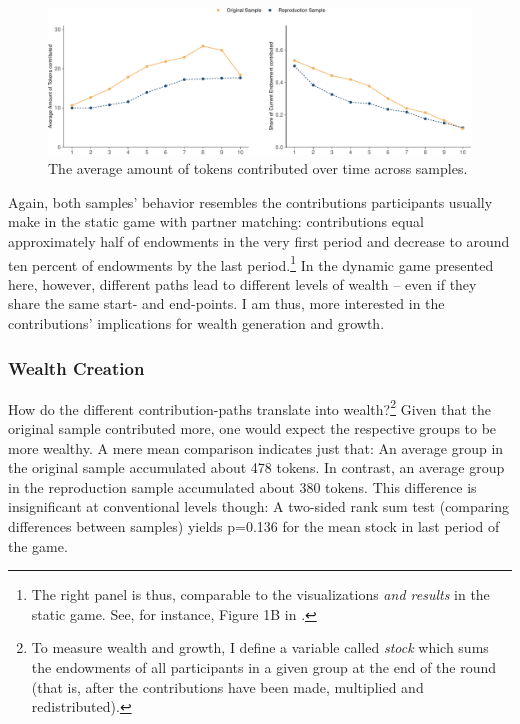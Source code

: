 \documentclass[
  authoryear,
  review,
  3p,
  onecolumn]{elsarticle}
\begin{document}
\begin{figure}

{\centering \includegraphics{paper_files/figure-pdf/fig-share-of-contributions-1.pdf}

}

\caption{\label{fig-share-of-contributions}The average amount of tokens
contributed over time across samples.}

\end{figure}

Again, both samples' behavior resembles the contributions participants
usually make in the static game with partner matching: contributions
equal approximately half of endowments in the very first period and
decrease to around ten percent of endowments by the last
period.\footnote{The right panel is thus, comparable to the
  visualizations \emph{and results} in the static game. See, for
  instance, Figure 1B in \citet[p.986]{fehrgaechter2000}.} In the
dynamic game presented here, however, different paths lead to different
levels of wealth -- even if they share the same start- and end-points. I
am thus, more interested in the contributions' implications for wealth
generation and growth.

\hypertarget{sec-wealth}{%
\subsubsection{Wealth Creation}\label{sec-wealth}}

How do the different contribution-paths translate into
wealth?\footnote{To measure wealth and growth, I define a variable
  called \emph{stock} which sums the endowments of all participants in a
  given group at the end of the round (that is, after the contributions
  have been made, multiplied and redistributed).} Given that the
original sample contributed more, one would expect the respective groups
to be more wealthy. A mere mean comparison indicates just that: An
average group in the original sample accumulated about 478 tokens. In
contrast, an average group in the reproduction sample accumulated about
380 tokens. This difference is insignificant at conventional levels
though: A two-sided rank sum test (comparing differences between
samples) yields p=0.136 for the mean stock in last period of the game.
\end{document}
